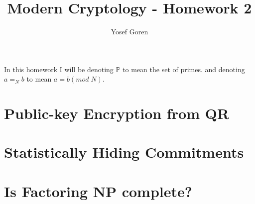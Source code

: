 \documentclass{article}
\DeclareMathOperator*{\eq}{=}
\begin{document}
\author{Yosef Goren}
\title{Modern Cryptology - Homework 2}
\maketitle
In this homework I will be denoting $\mathbb{P}$ to mean the set of primes.
and denoting $a\eq_N b$ to mean $a=b(mod\; N)$.
\section{Public-key Encryption from QR}

\section{Statistically Hiding Commitments}

\section{Is Factoring NP complete?}

\end{document}
